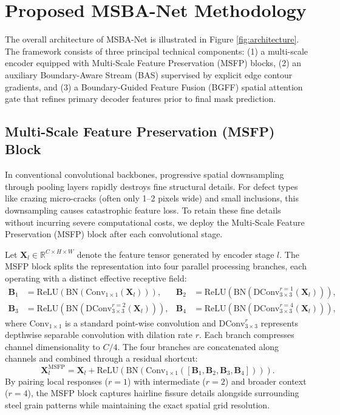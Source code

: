 \documentclass[10pt,a4paper]{article}
\begin{document}
\section{Proposed MSBA-Net Methodology}
The overall architecture of MSBA-Net is illustrated in Figure \ref{fig:architecture}. The framework consists of three principal technical components: (1) a multi-scale encoder equipped with Multi-Scale Feature Preservation (MSFP) blocks, (2) an auxiliary Boundary-Aware Stream (BAS) supervised by explicit edge contour gradients, and (3) a Boundary-Guided Feature Fusion (BGFF) spatial attention gate that refines primary decoder features prior to final mask prediction.

\subsection{Multi-Scale Feature Preservation (MSFP) Block}
In conventional convolutional backbones, progressive spatial downsampling through pooling layers rapidly destroys fine structural details. For defect types like crazing micro-cracks (often only 1--2 pixels wide) and small inclusions, this downsampling causes catastrophic feature loss. To retain these fine details without incurring severe computational costs, we deploy the Multi-Scale Feature Preservation (MSFP) block after each convolutional stage.

Let $\mathbf{X}_l \in \mathbb{R}^{C \times H \times W}$ denote the feature tensor generated by encoder stage $l$. The MSFP block splits the representation into four parallel processing branches, each operating with a distinct effective receptive field:
\begin{align}
  \mathbf{B}_1 &= \text{ReLU}\left(\text{BN}\left(\text{Conv}_{1\times 1}(\mathbf{X}_l)\right)\right), &
  \mathbf{B}_2 &= \text{ReLU}\left(\text{BN}\left(\text{DConv}_{3\times 3}^{r=1}(\mathbf{X}_l)\right)\right), \\
  \mathbf{B}_3 &= \text{ReLU}\left(\text{BN}\left(\text{DConv}_{3\times 3}^{r=2}(\mathbf{X}_l)\right)\right), &
  \mathbf{B}_4 &= \text{ReLU}\left(\text{BN}\left(\text{DConv}_{3\times 3}^{r=4}(\mathbf{X}_l)\right)\right),
\end{align}
where $\text{Conv}_{1\times 1}$ is a standard point-wise convolution and $\text{DConv}_{3\times 3}^{r}$ represents depthwise separable convolution with dilation rate $r$. Each branch compresses channel dimensionality to $C/4$. The four branches are concatenated along channels and combined through a residual shortcut:
\begin{equation}
  \mathbf{X}_l^{\text{MSFP}} = \mathbf{X}_l + \text{ReLU}\left(\text{BN}\left(\text{Conv}_{1\times 1}\left([\mathbf{B}_1, \mathbf{B}_2, \mathbf{B}_3, \mathbf{B}_4]\right)\right)\right).
\end{equation}
By pairing local responses ($r=1$) with intermediate ($r=2$) and broader context ($r=4$), the MSFP block captures hairline fissure details alongside surrounding steel grain patterns while maintaining the exact spatial grid resolution.
\end{document}
